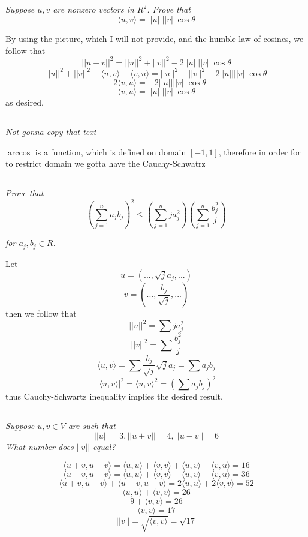\documentclass[11pt,oneside,titlepage]{book}
\newcommand{\eangle}[1]{\langle #1 \rangle}
\begin{document}
\subsection{}

\textit{Suppose $u, v$ are nonzero vectors in $R^2$. Prove that }
$$\langle u, v \rangle  = ||u||||v|| \cos \theta$$

By using the picture, which I will not provide, and the humble law of cosines,  we follow that
$$||u - v||^2 = ||u||^2 + ||v||^2 - 2||u||||v|| \cos \theta$$
$$||u||^2 + ||v||^2 - \eangle{u, v} - \eangle{v, u} = ||u||^2 + ||v||^2 - 2||u||||v|| \cos \theta$$
$$ - 2\eangle{v, u} =  - 2 ||u||||v|| \cos \theta$$
$$\eangle{v, u} =  ||u||||v|| \cos \theta$$
as desired.

\subsection{}

\textit{Not gonna copy that text}

$\arccos$ is a function, which is defined on domain $[-1, 1]$, therefore in order for
to restrict domain we gotta have the Cauchy-Schwatrz

\subsection{}

\textit{Prove that}
$$\left(\sum_{j = 1}^{n}{a_j b_j}\right)^2 \leq \left(\sum_{j = 1}^{n}{j a_j^2}\right)
\left(\sum_{j = 1}^{n}{\frac{b_j^2}{j} }\right)$$

\textit{for $a_j, b_j \in R$.}

Let
$$u = (..., \sqrt{j} a_j, ...)$$
$$v = (..., \frac{b_j}{\sqrt{j}}, ...)$$
then we follow that
$$||u||^2 = \sum{j a_j^2}$$
$$||v||^2 = \sum{\frac{b_j^2}{j}}$$
$$\eangle{u, v} = \sum{\frac{b_j}{\sqrt{j}} \sqrt{j} a_j } =
\sum{a_j b_j }$$
$$|\eangle{u, v}|^2 = \eangle{u, v}^2 = (\sum{a_j b_j })^2$$
thus Cauchy-Schwartz inequality implies the desired result.

\subsection{}

\textit{Suppose $u, v \in V$ are such that }
$$||u|| = 3, ||u + v|| = 4, ||u - v|| = 6$$
\textit{What number does $||v||$ equal?}

$$\eangle{u + v, u + v} = \eangle{u, u} + \eangle{v, v} + \eangle{u, v} + \eangle{v, u} = 16 $$
$$\eangle{u - v, u - v} = \eangle{u, u} + \eangle{v, v} - \eangle{u, v} - \eangle{v, u} = 36 $$
$$\eangle{u + v, u + v} + \eangle{u - v, u - v} = 2 \eangle{u, u} + 2 \eangle{v, v} = 52$$
$$\eangle{u, u} + \eangle{v, v} = 26$$
$$9 +  \eangle{v, v} = 26$$
$$\eangle{v, v} = 17$$
$$||v|| = \sqrt{\eangle{v, v}} = \sqrt{17}$$
\end{document}

